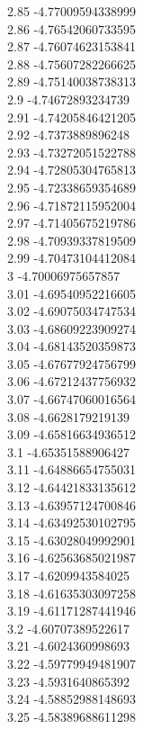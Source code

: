 {2.85	-4.77009594338999\\
2.86	-4.76542060733595\\
2.87	-4.76074623153841\\
2.88	-4.75607282266625\\
2.89	-4.75140038738313\\
2.9	-4.74672893234739\\
2.91	-4.74205846421205\\
2.92	-4.7373889896248\\
2.93	-4.73272051522788\\
2.94	-4.72805304765813\\
2.95	-4.72338659354689\\
2.96	-4.71872115952004\\
2.97	-4.71405675219786\\
2.98	-4.70939337819509\\
2.99	-4.70473104412084\\
3	-4.70006975657857\\
3.01	-4.69540952216605\\
3.02	-4.69075034747534\\
3.03	-4.68609223909274\\
3.04	-4.68143520359873\\
3.05	-4.67677924756799\\
3.06	-4.67212437756932\\
3.07	-4.66747060016564\\
3.08	-4.6628179219139\\
3.09	-4.65816634936512\\
3.1	-4.65351588906427\\
3.11	-4.64886654755031\\
3.12	-4.64421833135612\\
3.13	-4.63957124700846\\
3.14	-4.63492530102795\\
3.15	-4.63028049992901\\
3.16	-4.62563685021987\\
3.17	-4.6209943584025\\
3.18	-4.61635303097258\\
3.19	-4.61171287441946\\
3.2	-4.60707389522617\\
3.21	-4.6024360998693\\
3.22	-4.59779949481907\\
3.23	-4.5931640865392\\
3.24	-4.58852988148693\\
3.25	-4.58389688611298\\
}
